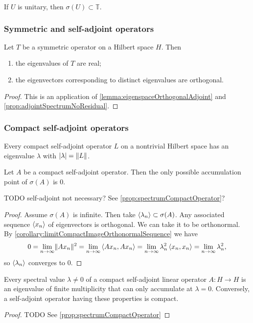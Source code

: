 \begin{proposition}
If $U$ is unitary, then $\sigma(U)\subset \mathbb{T}$.
\end{proposition}

\subsubsection{Symmetric and self-adjoint operators}
\begin{proposition}
Let $T$ be a symmetric operator on a Hilbert space $H$. Then
\begin{enumerate}
\item the eigenvalues of $T$ are real;
\item the eigenvectors corresponding to distinct eigenvalues are orthogonal.
\end{enumerate}
\end{proposition}
\begin{proof}
This is an application of \ref{lemma:eigenspaceOrthogonalAdjoint} and \ref{prop:adjointSpectrumNoResidual}.
\end{proof}

\subsubsection{Compact self-adjoint operators}
\begin{proposition}
Every compact self-adjoint operator $L$ on a nontrivial Hilbert space has an eigenvalue $\lambda$ with $|\lambda| = \lVert L\rVert$.
\end{proposition}

\begin{proposition}
Let $A$ be a compact self-adjoint operator. Then the only possible accumulation point of $\sigma(A)$ is $0$.
\end{proposition}
TODO self-adjoint not necessary? See \ref{prop:spectrumCompactOperator}?
\begin{proof}
Assume $\sigma(A)$ is infinite. Then take $\langle \lambda_n \rangle\subset \sigma(A)$. Any associated sequence $\langle x_n \rangle$ of eigenvectors is orthogonal. We can take it to be orthonormal. By \ref{corollary:limitCompactImageOrthonormalSequence} we have
\[ 0 = \lim_{n\to\infty} \lVert Ax_n\rVert^2 = \lim_{n\to\infty}\left\langle Ax_n,Ax_n \right\rangle = \lim_{n\to\infty}\lambda_n^2\left\langle x_n,x_n \right\rangle = \lim_{n\to\infty}\lambda_n^2, \]
so $\langle \lambda_n \rangle$ converges to $0$.
\end{proof}

\begin{theorem}
Every spectral value $\lambda\neq 0$ of a compact self-adjoint linear
operator $A : H \to H$ is an eigenvalue of finite multiplicity that can only
accumulate at $\lambda = 0$. Conversely, a self-adjoint operator having these
properties is compact.
\end{theorem}
\begin{proof}
TODO See \ref{prop:spectrumCompactOperator}
\end{proof}

